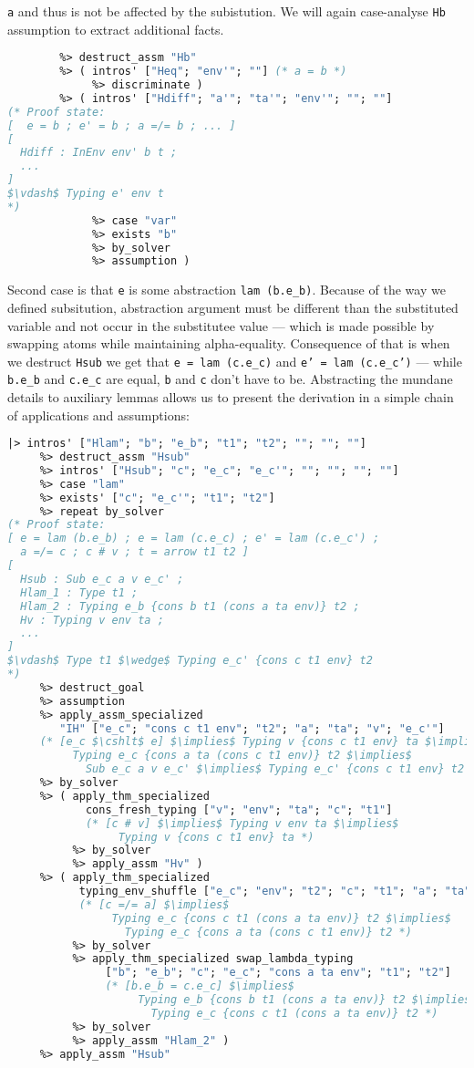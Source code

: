 \documentclass[english, mgr]{iithesis}
\renewcommand{\tt}[1]{\texttt{\small{#1}}}
\begin{document}
\tt{a} and thus is not be affected by the subistution.
We will again case-analyse \tt{Hb} assumption to extract additional facts.
\begin{lstlisting}[mathescape, language=OCaml]
     %> ( intros' ["Hdiff"; "b'"; ""; ""; ""] (* a =/= b *)
        %> destruct_assm "Hb"
        %> ( intros' ["Heq"; "env'"; ""] (* a = b *)
             %> discriminate )
        %> ( intros' ["Hdiff"; "a'"; "ta'"; "env'"; ""; ""]
(* Proof state:
[  e = b ; e' = b ; a =/= b ; ... ]
[
  Hdiff : InEnv env' b t ;
  ...
]
$\vdash$ Typing e' env t
*)
             %> case "var"
             %> exists "b"
             %> by_solver
             %> assumption )
\end{lstlisting}
Second case is that \tt{e} is some abstraction \tt{lam (b.e\_b)}.
Because of the way we defined subsitution, abstraction argument must
be different than the substituted variable and not occur in the substitutee value
--- which is made possible by swapping atoms while maintaining alpha-equality.
Consequence of that is when we destruct \tt{Hsub} we get that
\tt{e = lam (c.e\_c)} and \tt{e' = lam (c.e\_c')}
--- while \tt{b.e\_b} and \tt{c.e\_c} are equal, \tt{b} and \tt{c} don't have to be.
Abstracting the mundane details to auxiliary lemmas allows us to present the
derivation in a simple chain of applications and assumptions:
\begin{lstlisting}[mathescape, language=OCaml]
  |> intros' ["Hlam"; "b"; "e_b"; "t1"; "t2"; ""; ""; ""]
     %> destruct_assm "Hsub"
     %> intros' ["Hsub"; "c"; "e_c"; "e_c'"; ""; ""; ""; ""]
     %> case "lam"
     %> exists' ["c"; "e_c'"; "t1"; "t2"]
     %> repeat by_solver
(* Proof state:
[ e = lam (b.e_b) ; e = lam (c.e_c) ; e' = lam (c.e_c') ;
  a =/= c ; c # v ; t = arrow t1 t2 ]
[
  Hsub : Sub e_c a v e_c' ;
  Hlam_1 : Type t1 ;
  Hlam_2 : Typing e_b {cons b t1 (cons a ta env)} t2 ;
  Hv : Typing v env ta ;
  ...
]
$\vdash$ Type t1 $\wedge$ Typing e_c' {cons c t1 env} t2
*)
     %> destruct_goal
     %> assumption
     %> apply_assm_specialized
        "IH" ["e_c"; "cons c t1 env"; "t2"; "a"; "ta"; "v"; "e_c'"]
     (* [e_c $\cshlt$ e] $\implies$ Typing v {cons c t1 env} ta $\implies$
          Typing e_c {cons a ta (cons c t1 env)} t2 $\implies$
            Sub e_c a v e_c' $\implies$ Typing e_c' {cons c t1 env} t2  *)
     %> by_solver
     %> ( apply_thm_specialized
            cons_fresh_typing ["v"; "env"; "ta"; "c"; "t1"]
            (* [c # v] $\implies$ Typing v env ta $\implies$
                 Typing v {cons c t1 env} ta *)
          %> by_solver
          %> apply_assm "Hv" )
     %> ( apply_thm_specialized
           typing_env_shuffle ["e_c"; "env"; "t2"; "c"; "t1"; "a"; "ta"]
           (* [c =/= a] $\implies$
                Typing e_c {cons c t1 (cons a ta env)} t2 $\implies$
                  Typing e_c {cons a ta (cons c t1 env)} t2 *)
          %> by_solver
          %> apply_thm_specialized swap_lambda_typing
               ["b"; "e_b"; "c"; "e_c"; "cons a ta env"; "t1"; "t2"]
               (* [b.e_b = c.e_c] $\implies$
                    Typing e_b {cons b t1 (cons a ta env)} t2 $\implies$
                      Typing e_c {cons c t1 (cons a ta env)} t2 *)
          %> by_solver
          %> apply_assm "Hlam_2" )
     %> apply_assm "Hsub"
\end{lstlisting}
\end{document}
